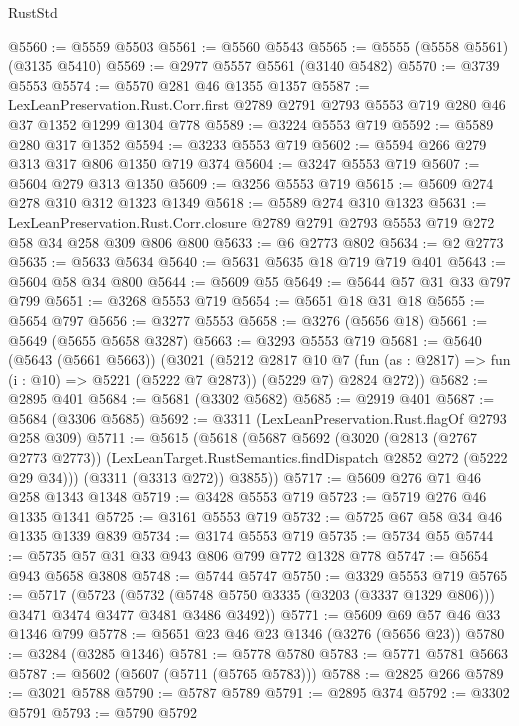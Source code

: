 \begin{lexlean}{RustStd}
\begin{coremodule}
{\begin{coremodule}
{{{{{{{{{{{{{{{@5560 := @5559 @5503
@5561 := @5560 @5543
@5565 := @5555 (@5558 @5561) (@3135 @5410)
@5569 := @2977 @5557 @5561 (@3140 @5482)
@5570 := @3739 @5553
@5574 := @5570 @281 @46 @1355 @1357
@5587 := LexLeanPreservation.Rust.Corr.first
    @2789
    @2791
    @2793
    @5553
    @719
    @280
    @46
    @37
    @1352
    @1299
    @1304
    @778
@5589 := @3224 @5553 @719
@5592 := @5589 @280 @317 @1352
@5594 := @3233 @5553 @719
@5602 := @5594 @266 @279 @313 @317 @806 @1350 @719 @374
@5604 := @3247 @5553 @719
@5607 := @5604 @279 @313 @1350
@5609 := @3256 @5553 @719
@5615 := @5609 @274 @278 @310 @312 @1323 @1349
@5618 := @5589 @274 @310 @1323
@5631 := LexLeanPreservation.Rust.Corr.closure
    @2789
    @2791
    @2793
    @5553
    @719
    @272
    @58
    @34
    @258
    @309
    @806
    @800
@5633 := @6 @2773 @802
@5634 := @2 @2773
@5635 := @5633 @5634
@5640 := @5631 @5635 @18 @719 @719 @401
@5643 := @5604 @58 @34 @800
@5644 := @5609 @55
@5649 := @5644 @57 @31 @33 @797 @799
@5651 := @3268 @5553 @719
@5654 := @5651 @18 @31 @18
@5655 := @5654 @797
@5656 := @3277 @5553
@5658 := @3276 (@5656 @18)
@5661 := @5649 (@5655 @5658 @3287)
@5663 := @3293 @5553 @719
@5681 := @5640
    (@5643 (@5661 @5663))
    (@3021
      (@5212
        @2817
        @10
        @7
        (fun (as : @2817) => fun (i : @10) => @5221 (@5222 @7 @2873))
        (@5229 @7)
        @2824
        @272))
@5682 := @2895 @401
@5684 := @5681 (@3302 @5682)
@5685 := @2919 @401
@5687 := @5684 (@3306 @5685)
@5692 := @3311 (LexLeanPreservation.Rust.flagOf @2793 @258 @309)
@5711 := @5615
    (@5618
      (@5687
        @5692
        (@3020
          (@2813 (@2767 @2773 @2773))
          (LexLeanTarget.RustSemantics.findDispatch @2852 @272 (@5222 @29 @34)))
        (@3311 (@3313 @272))
        @3855))
@5717 := @5609 @276 @71 @46 @258 @1343 @1348
@5719 := @3428 @5553 @719
@5723 := @5719 @276 @46 @1335 @1341
@5725 := @3161 @5553 @719
@5732 := @5725 @67 @58 @34 @46 @1335 @1339 @839
@5734 := @3174 @5553 @719
@5735 := @5734 @55
@5744 := @5735 @57 @31 @33 @943 @806 @799 @772 @1328 @778
@5747 := @5654 @943 @5658 @3808
@5748 := @5744 @5747
@5750 := @3329 @5553 @719
@5765 := @5717
    (@5723
      (@5732 (@5748 @5750 @3335 (@3203 (@3337 @1329 @806))) @3471 @3474 @3477 @3481 @3486 @3492))
@5771 := @5609 @69 @57 @46 @33 @1346 @799
@5778 := @5651 @23 @46 @23 @1346 (@3276 (@5656 @23))
@5780 := @3284 (@3285 @1346)
@5781 := @5778 @5780
@5783 := @5771 @5781 @5663
@5787 := @5602 (@5607 (@5711 (@5765 @5783)))
@5788 := @2825 @266
@5789 := @3021 @5788
@5790 := @5787 @5789
@5791 := @2895 @374
@5792 := @3302 @5791
@5793 := @5790 @5792
}}}}}}}}}}}}}}}
\end{coremodule}}
\end{coremodule}
\end{lexlean}
